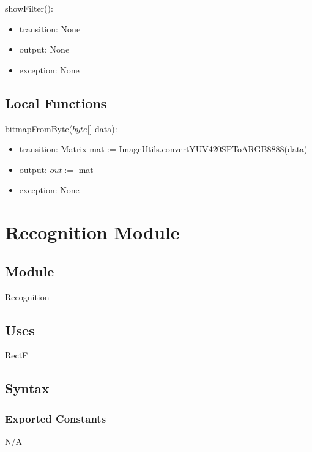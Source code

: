 \documentclass[12pt, titlepage]{article}
\begin{document}
\noindent showFilter():
\begin{itemize}
\item transition: None\\
\item output: None\\
\item exception: None\\
\end{itemize}

\subsection*{Local Functions}


\noindent bitmapFromByte($byte$[] data):
\begin{itemize}
\item transition: Matrix mat := ImageUtils.convertYUV420SPToARGB8888(data)
\item output: $out := $ mat\\
\item exception: None\\
\end{itemize}


\medskip
\medskip


\newpage

\section* {Recognition Module}

\subsection*{Module}

Recognition

\subsection* {Uses}

RectF

\subsection* {Syntax}

\subsubsection* {Exported Constants}

N/A
\end{document}
